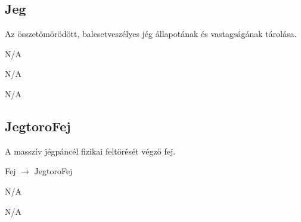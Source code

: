 \subsection{Jeg}
\begin{class-template-responsibility}
    Az összetömörödött, balesetveszélyes jég állapotának és vastagságának tárolása.
\end{class-template-responsibility}
\begin{class-template-baseclass}
    N/A
\end{class-template-baseclass}
\begin{class-template-interface}
    N/A
\end{class-template-interface}
\begin{class-template-attribute}
\end{class-template-attribute}
\begin{class-template-method}
    N/A
\end{class-template-method}

\subsection{JegtoroFej}
\begin{class-template-responsibility}
    A masszív jégpáncél fizikai feltörését végző fej.
\end{class-template-responsibility}
\begin{class-template-baseclass}
    Fej $\rightarrow$ JegtoroFej
\end{class-template-baseclass}
\begin{class-template-interface}
    N/A
\end{class-template-interface}
\begin{class-template-attribute}
    N/A
\end{class-template-attribute}
\begin{class-template-method}
\end{class-template-method}

